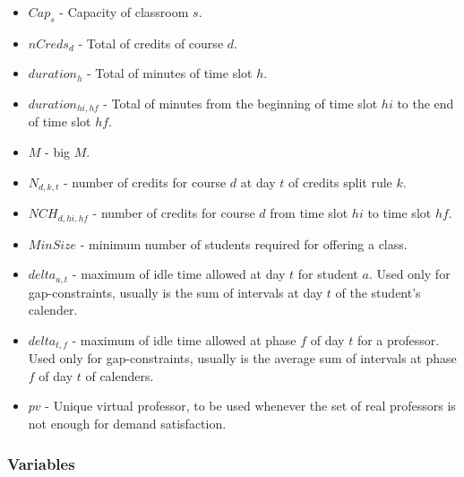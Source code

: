 \begin{itemize}
\item $Cap_{s}$ - Capacity of classroom $s$.
\item $nCreds_{d}$ - Total of credits of course $d$.
\item $duration_{h}$ - Total of minutes of time slot $h$.
\item $duration_{hi,hf}$ - Total of minutes from the beginning of time slot $hi$ to the end of time slot $hf$.
\item $M$ - big $M$.
\item $N_{d,k,t}$ - number of credits for course $d$ at day $t$ of credits split rule $k$.
\item $NCH_{d,hi,hf}$ - number of credits for course $d$ from time slot $hi$ to time slot $hf$.
\item $MinSize$ - minimum number of students required for offering a class.
\item $delta_{a,t}$ - maximum of idle time allowed at day $t$ for student $a$. Used only for gap-constraints, usually is the sum of intervals at day $t$ of the student's calender.
\item $delta_{t,f}$ - maximum of idle time allowed at phase $f$ of day $t$ for a professor. Used only for gap-constraints, usually is the average sum of intervals at phase $f$ of day $t$ of calenders.
\item $pv$ - Unique virtual professor, to be used whenever the set of real professors is not enough for demand satisfaction.
\end{itemize}

\subsubsection{Variables}

